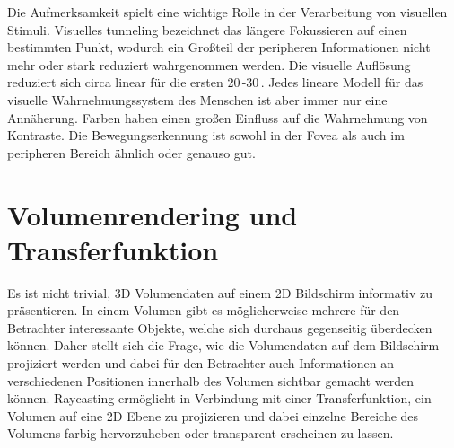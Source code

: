 Die Aufmerksamkeit spielt eine wichtige Rolle in der Verarbeitung von visuellen Stimuli. %
Visuelles tunneling bezeichnet das längere Fokussieren auf einen bestimmten Punkt, wodurch ein Großteil der peripheren Informationen nicht mehr oder stark reduziert wahrgenommen werden.
Die visuelle Auflösung reduziert sich circa linear für die ersten 20\,\textdegree{}-30\,\textdegree{}.
Jedes lineare Modell für das visuelle Wahrnehmungssystem des Menschen ist aber immer nur eine Annäherung.
Farben haben einen großen Einfluss auf die Wahrnehmung von Kontraste.
Die Bewegungserkennung ist sowohl in der Fovea als auch im peripheren Bereich ähnlich oder genauso gut.

\section{Volumenrendering und Transferfunktion}\label{sec::voltff}
Es ist nicht trivial, 3D Volumendaten auf einem 2D Bildschirm informativ zu präsentieren.
In einem Volumen gibt es möglicherweise mehrere für den Betrachter interessante Objekte, welche sich durchaus gegenseitig überdecken können.
Daher stellt sich die Frage, wie die Volumendaten auf dem Bildschirm projiziert werden und dabei für den Betrachter auch Informationen an verschiedenen Positionen innerhalb des Volumen sichtbar gemacht werden können.
Raycasting ermöglicht in Verbindung mit einer Transferfunktion, ein Volumen auf eine 2D Ebene zu projizieren und dabei einzelne Bereiche des Volumens farbig hervorzuheben oder transparent erscheinen zu lassen.

